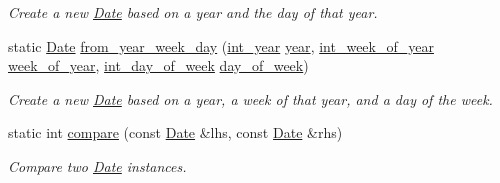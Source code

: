 \begin{DoxyCompactItemize}
\begin{DoxyCompactList}\small\item\em Create a new \hyperlink{structDate}{Date} based on a year and the day of that year. \end{DoxyCompactList}\item 
static \hyperlink{structDate}{Date} \hyperlink{structDate_a88c032d0e05efa136df450f1d3564760}{from\-\_\-year\-\_\-week\-\_\-day} (\hyperlink{types_8h_a7ff53e164374f5b24e06f3c04362e61d}{int\-\_\-year} \hyperlink{structDate_aac4f4635d8db0ea1a32c2f979a1a6cc0}{year}, \hyperlink{types_8h_af13e483c5f00ae8ea8ada4c7f5fad337}{int\-\_\-week\-\_\-of\-\_\-year} \hyperlink{structDate_af051f922cdc105f86b92fc6d8bbdfa90}{week\-\_\-of\-\_\-year}, \hyperlink{types_8h_a78b244794c680f1753a6d92eed77aeda}{int\-\_\-day\-\_\-of\-\_\-week} \hyperlink{structDate_ac85eed3a3b2d579cdc74b2af801740b0}{day\-\_\-of\-\_\-week})
\begin{DoxyCompactList}\small\item\em Create a new \hyperlink{structDate}{Date} based on a year, a week of that year, and a day of the week. \end{DoxyCompactList}\item 
static int \hyperlink{structDate_afc234509ba1c8b1717e52181e7ad256d}{compare} (const \hyperlink{structDate}{Date} \&lhs, const \hyperlink{structDate}{Date} \&rhs)
\begin{DoxyCompactList}\small\item\em Compare two \hyperlink{structDate}{Date} instances. \end{DoxyCompactList}\end{DoxyCompactItemize}
